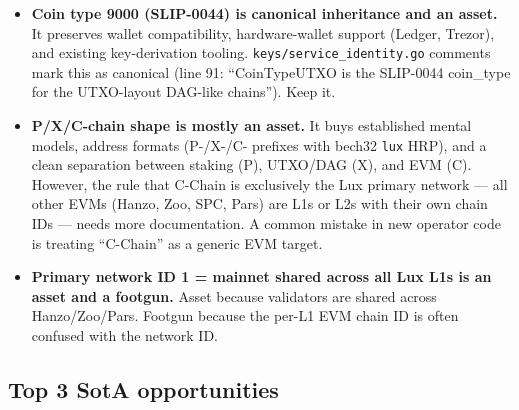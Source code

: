 \documentclass[11pt,a4paper]{article}
\begin{document}
\begin{itemize}[leftmargin=1.4em,topsep=0.2em,itemsep=0.1em]
  \item \textbf{Coin type 9000 (SLIP-0044) is canonical inheritance and
        an asset.} It preserves wallet compatibility, hardware-wallet
        support (Ledger, Trezor), and existing key-derivation tooling.
        \texttt{keys/service\_identity.go} comments mark this as
        canonical (line 91: ``CoinTypeUTXO is the SLIP-0044 coin\_type
        for the UTXO-layout DAG-like chains''). Keep it.
  \item \textbf{P/X/C-chain shape is mostly an asset.} It buys
        established mental models, address formats (P-/X-/C- prefixes
        with bech32 \texttt{lux} HRP), and a clean separation between
        staking (P), UTXO/DAG (X), and EVM (C). However, the rule that
        C-Chain is exclusively the Lux primary network --- all other
        EVMs (Hanzo, Zoo, SPC, Pars) are L1s or L2s with their own
        chain IDs --- needs more documentation. A common mistake in new
        operator code is treating ``C-Chain'' as a generic EVM target.
  \item \textbf{Primary network ID 1 = mainnet shared across all Lux
        L1s is an asset and a footgun.} Asset because validators are
        shared across Hanzo/Zoo/Pars. Footgun because the
        per-L1 EVM chain ID is often confused with the network ID.
\end{itemize}

\subsection{Top 3 SotA opportunities}
\end{document}
